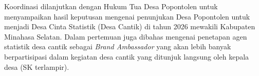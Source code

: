 Koordinasi dilanjutkan dengan Hukum Tua Desa Popontolen untuk menyampaikan hasil keputusan mengenai penunjukan Desa Popontolen untuk menjadi Desa Cinta Statistik (Desa Cantik) di tahun 2026 mewakili Kabupaten Minahasa Selatan. Dalam pertemuan juga dibahas mengenai penetapan agen statistik desa cantik sebagai \textit{Brand Ambassador} yang akan lebih banyak berpartisipasi dalam kegiatan desa cantik yang ditunjuk langsung oleh kepala desa (SK terlampir).
